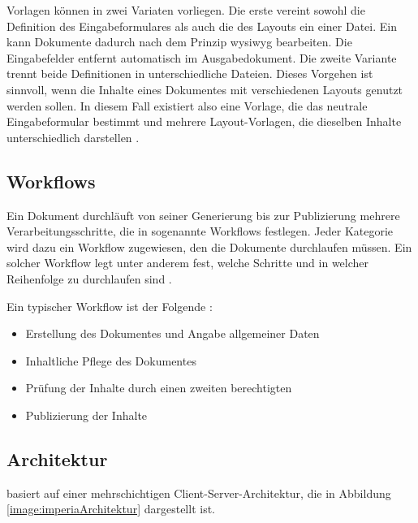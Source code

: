             Vorlagen können in zwei Variaten vorliegen.
            Die erste vereint sowohl die Definition des Eingabeformulares
            als auch die des Layouts ein einer Datei.
            Ein {\editor} kann Dokumente dadurch nach dem Prinzip \gls{wysiwyg} bearbeiten.
            Die Eingabefelder entfernt {\imperia} automatisch im Ausgabedokument.
            Die zweite Variante trennt beide Definitionen in unterschiedliche Dateien.
            Dieses Vorgehen ist sinnvoll, wenn die Inhalte eines Dokumentes mit
            verschiedenen Layouts genutzt werden sollen.
            In diesem Fall existiert also eine Vorlage,
            die das neutrale Eingabeformular bestimmt
            und mehrere Layout-Vorlagen, die dieselben Inhalte unterschiedlich darstellen
            \cite[Kapitel 36]{imperia:ecmd}.

        \subsection{Workflows}
            Ein Dokument durchläuft von seiner Generierung bis zur
            Publizierung mehrere Verarbeitungsschritte,
            die in {\imperia} sogenannte Workflows festlegen.
            Jeder Kategorie wird dazu ein Workflow zugewiesen,
            den die Dokumente durchlaufen müssen.
            Ein solcher Workflow legt unter anderem fest,
            welche Schritte und in welcher Reihenfolge
            zu durchlaufen sind
            \cite[Kapitel 1.1.5]{imperia:ecmd}.

            Ein typischer Workflow ist der Folgende
            \cite[Kapitel 1.1]{imperia:ecmd}:

            \begin{itemize}
                \item Erstellung des Dokumentes und Angabe allgemeiner Daten
                \item Inhaltliche Pflege des Dokumentes
                \item Prüfung der Inhalte durch einen zweiten berechtigten \editor
                \item Publizierung der Inhalte
            \end{itemize}

        \subsection{Architektur}
            {\imperia} basiert auf einer mehrschichtigen Client-Server-Architektur,
            die in Abbildung \ref{image:imperiaArchitektur} dargestellt ist.

